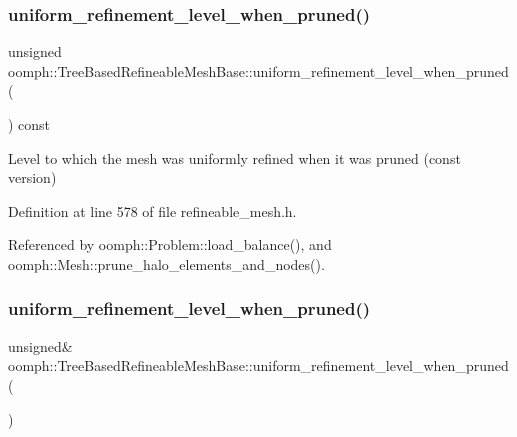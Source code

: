 \subsubsection{\texorpdfstring{uniform\+\_\+refinement\+\_\+level\+\_\+when\+\_\+pruned()}{uniform\_refinement\_level\_when\_pruned()}\hspace{0.1cm}{\footnotesize\ttfamily [1/2]}}
{\footnotesize\ttfamily unsigned oomph\+::\+Tree\+Based\+Refineable\+Mesh\+Base\+::uniform\+\_\+refinement\+\_\+level\+\_\+when\+\_\+pruned (\begin{DoxyParamCaption}{ }\end{DoxyParamCaption}) const\hspace{0.3cm}{\ttfamily [inline]}}



Level to which the mesh was uniformly refined when it was pruned (const version) 



Definition at line 578 of file refineable\+\_\+mesh.\+h.



Referenced by oomph\+::\+Problem\+::load\+\_\+balance(), and oomph\+::\+Mesh\+::prune\+\_\+halo\+\_\+elements\+\_\+and\+\_\+nodes().

\mbox{\label{classoomph_1_1TreeBasedRefineableMeshBase_a7514c207f648191b11b70319e1c978d5}} 
\subsubsection{\texorpdfstring{uniform\+\_\+refinement\+\_\+level\+\_\+when\+\_\+pruned()}{uniform\_refinement\_level\_when\_pruned()}\hspace{0.1cm}{\footnotesize\ttfamily [2/2]}}
{\footnotesize\ttfamily unsigned\& oomph\+::\+Tree\+Based\+Refineable\+Mesh\+Base\+::uniform\+\_\+refinement\+\_\+level\+\_\+when\+\_\+pruned (\begin{DoxyParamCaption}{ }\end{DoxyParamCaption})\hspace{0.3cm}{\ttfamily [inline]}}



